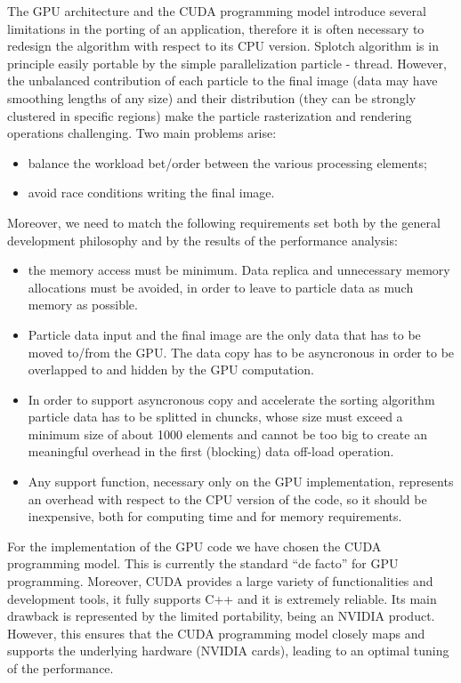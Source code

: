 \documentclass[11pt]{article}
\begin{document}
The GPU architecture and the CUDA programming model introduce several limitations in the porting of an application, therefore it is often necessary to redesign the algorithm with respect to its CPU version. Splotch algorithm is in principle easily portable by the simple parallelization particle - thread. However, the unbalanced contribution of each particle to the final image (data may have smoothing lengths of any size) and their distribution (they can be strongly clustered in specific regions) make the particle rasterization and rendering operations challenging. 
Two main problems arise:
\begin{itemize}
\item 
balance the workload bet/order between the various processing elements;
\item
avoid race conditions writing the final image. 
\end{itemize}
Moreover, we need to match the following requirements set both by the general development philosophy and by the 
results of the performance analysis:
\begin{itemize}
\item
the memory access must be minimum. Data replica and unnecessary 
memory allocations must be avoided, in order to leave to particle
data as much memory as possible. 
\item
Particle data input and the final image are the only data that has to 
be moved to/from the GPU. The data copy has to be asyncronous in order
to be overlapped to and hidden by the GPU computation.
\item
In order to support asyncronous copy and accelerate the sorting algorithm
particle data has to be splitted in chuncks, whose size must exceed 
a minimum size of about 1000 elements and cannot be too big to create an
meaningful overhead in the first (blocking) data off-load operation.
\item
Any support function, necessary only on the GPU implementation, represents an overhead
with respect to the CPU version of the code, so it should be inexpensive,
both for computing time and for memory requirements. 
\end{itemize}
For the implementation of the GPU code we have chosen the CUDA programming
model. This is currently the standard ``de facto'' for GPU programming.
Moreover, CUDA provides a large variety of functionalities and
development tools, it fully supports C++ and it is extremely reliable. Its main drawback is
represented by the limited portability, being an NVIDIA product. However, 
this ensures that the CUDA programming model closely maps and supports the underlying 
hardware (NVIDIA cards), leading to an optimal tuning of the performance.  
\end{document}
